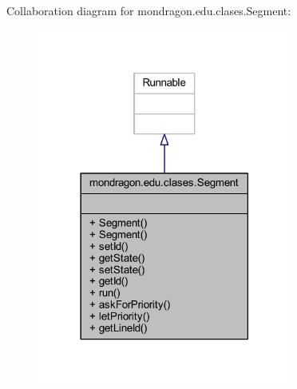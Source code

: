 Collaboration diagram for mondragon.\+edu.\+clases.\+Segment\+:\nopagebreak
\begin{figure}[H]
\begin{center}
\leavevmode
\includegraphics[width=237pt]{classmondragon_1_1edu_1_1clases_1_1_segment__coll__graph}
\end{center}
\end{figure}
